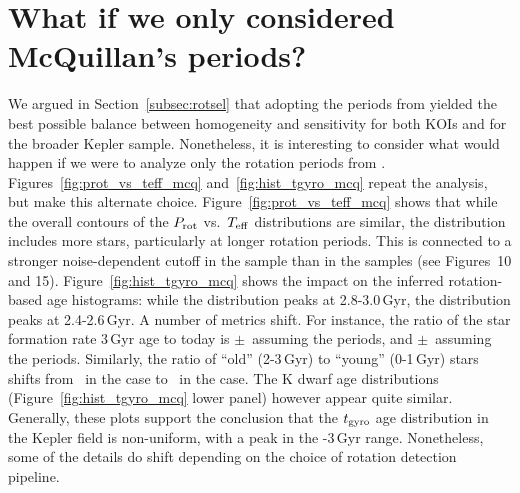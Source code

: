\documentclass[11pt,twocolumn,tighten,linenumbers,trackchanges]{aastex63}
\begin{document}
\section{What if we only considered McQuillan's periods?}
\label{app:mcqonly}

We argued in Section~\ref{subsec:rotsel} that adopting
the periods from \citet{Santos_2019,Santos_2021} yielded the best
possible balance between homogeneity and sensitivity for both KOIs and
for the broader Kepler sample.  Nonetheless, it is interesting to
consider what would happen if we were to analyze only the rotation
periods from \citet{McQuillan_2014}.
Figures~\ref{fig:prot_vs_teff_mcq} and~\ref{fig:hist_tgyro_mcq} repeat
the analysis, but make this alternate choice.
Figure~\ref{fig:prot_vs_teff_mcq} shows that while the overall
contours of the $P_{\rm rot}$ vs.~$T_{\rm eff}$ distributions are
similar, the \citeauthor{Santos_2019} distribution includes more
stars, particularly at longer rotation periods.  This is connected to
a stronger noise-dependent cutoff in the \citet{McQuillan_2014} sample
than in the \citeauthor{Santos_2019} samples (see
\citealt{Masuda2022_amplevoln} Figures~10 and 15).
Figure~\ref{fig:hist_tgyro_mcq} shows the impact on the inferred
rotation-based age histograms: while the \citeauthor{Santos_2019}
distribution peaks at 2.8-3.0\,Gyr, the \citeauthor{McQuillan_2014}
distribution peaks at 2.4-2.6\,Gyr.  A number of metrics shift.  For
instance, the ratio of the star formation rate 3\,Gyr age to today is
\ratiosfr$\pm$\uncratiosfr\ assuming the \citeauthor{Santos_2019}
periods, and \mcquillanonlyratiosfr$\pm$\mcquillanonlyuncratiosfr\
assuming the \citeauthor{McQuillan_2014} periods.  Similarly, the
ratio of ``old'' (2-3\,Gyr) to ``young'' (0-1\,Gyr) stars shifts from
\ratioobtoybstars\ in the \citeauthor{Santos_2019} case to
\mcquillanonlyratioobtoybstars\ in the \citeauthor{McQuillan_2014}
case.  The K dwarf age distributions (Figure~\ref{fig:hist_tgyro_mcq}
lower panel) however appear quite similar.  Generally, these plots
support the conclusion that the $t_{\rm gyro}$ age distribution in the
Kepler field is non-uniform, with a peak in the \replaced{2.5}{2.3}-3\,Gyr range.
Nonetheless, some of the details do shift depending on the choice of
rotation detection pipeline.
\end{document}
